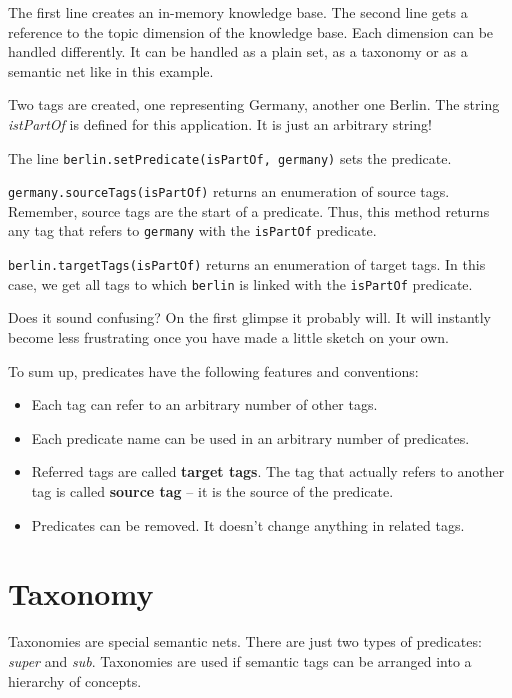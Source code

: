 The first line creates an in-memory knowledge base. The second line
gets a reference to the topic dimension of the knowledge base. Each dimension can be handled differently. It can be handled as a plain set, as a taxonomy or as a semantic net like in this example.

Two tags are created, one representing Germany, another one Berlin. The string {\it istPartOf} is defined for this application. It is just an arbitrary string! 

The line {\verb|berlin.setPredicate(isPartOf, germany)|} sets the predicate. 

{\verb|germany.sourceTags(isPartOf)|} returns an enumeration of source tags.
Remember, source tags are the start of a predicate. Thus, this method returns any tag that refers to {\tt germany} with the {\tt isPartOf} predicate.

{\verb|berlin.targetTags(isPartOf)|} returns an enumeration of target tags.
In this case, we get all tags to which {\tt berlin} is linked with the {\tt isPartOf} predicate.

Does it sound confusing? On the first glimpse it probably will. It will instantly become less frustrating once you have made a little sketch on your own.

To sum up, predicates have the following features and conventions:

\begin{itemize}

\item Each tag can refer to an arbitrary number of other tags. 

\item
Each predicate name can be used in an arbitrary number of predicates.

\item
Referred tags are called {\bf target tags}. The tag that actually refers to another tag is called {\bf source tag} -- it is the source of the predicate.

\item
Predicates can be removed. It doesn't change anything in related tags.

\end{itemize}

\section{Taxonomy}
Taxonomies are special semantic nets. There are just two types of predicates:
{\it super} and {\it sub}. Taxonomies are used if semantic tags can be arranged into a hierarchy of concepts.

